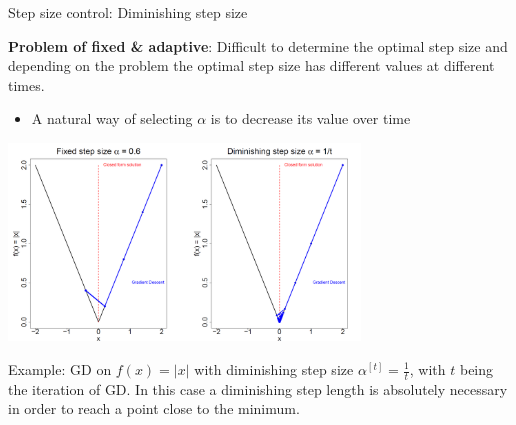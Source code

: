 \documentclass[11pt,compress,t,notes=noshow, xcolor=table]{beamer}
\begin{document}
	
	\begin{vbframe}{Step size control: Diminishing step size}
	\begin{footnotesize}
	\textbf{Problem of fixed \& adaptive}: Difficult to determine the optimal step size and depending on the problem the optimal step size has different values at different times.
	\end{footnotesize}
	
		\begin{itemize}
			\item A natural way of selecting $\alpha$ is to decrease its value over time
		\end{itemize}

		\begin{center}
			\includegraphics[width = 0.7\textwidth]{figure_man/example-GD.png} \\
			\begin{footnotesize} Example: GD on $f(x) = |x|$ with diminishing step size $\alpha^{[t]} = \frac{1}{t}$, with $t$ being the iteration of GD. In this case a diminishing step length is absolutely necessary in order to reach a point close to the minimum.
			\end{footnotesize}
		\end{center}
		
	\end{vbframe}	
	
\end{document}
